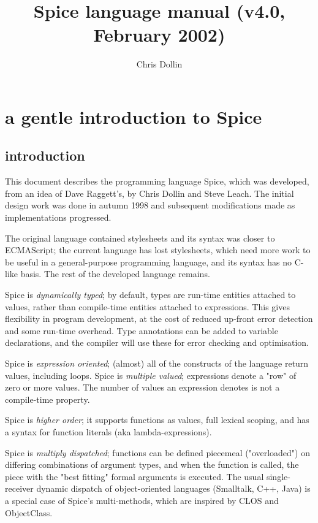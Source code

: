 \documentclass{report}
\title{Spice language manual (v4.0, February 2002)
}
\author{Chris Dollin}
\begin{document}
\maketitle
\tableofcontents




\part{a gentle introduction to Spice}
\chapter{introduction}


This document describes the programming language Spice, which was developed,
from an idea of Dave Raggett's, by Chris Dollin and Steve Leach. The initial
design work was done in autumn 1998 and subsequent modifications made as
implementations progressed.

The original language contained stylesheets and its syntax was closer to
ECMAScript; the current language has lost stylesheets, which need more
work to be useful in a general-purpose programming language, and its syntax
has no C-like basis. The rest of the developed language remains.

Spice is {\em dynamically typed}; by default, types are run-time entities
attached to values, rather than compile-time entities attached to expressions.
This gives flexibility in program development, at the cost of reduced
up-front error detection and some run-time overhead. Type annotations
can be added to variable declarations, and the compiler will use these for
error checking and optimisation.

Spice is {\em expression oriented}; (almost) all of the constructs of the
language return values, including loops. Spice is {\em multiple valued};
expressions denote a "row" of zero or more values. The number of values an
expression denotes is not a compile-time property.

Spice is {\em higher order}; it supports functions as values, full lexical
scoping, and has a syntax for function literals (aka lambda-expressions).

Spice is {\em multiply dispatched}; functions can be defined piecemeal
("overloaded") on differing combinations of argument types, and when the
function is called, the piece with the "best fitting" formal arguments is
executed. The usual single-receiver dynamic dispatch of object-oriented
languages (Smalltalk, C++, Java) is a special case of Spice's multi-methods,
which are inspired by CLOS and ObjectClass.
\end{document}
